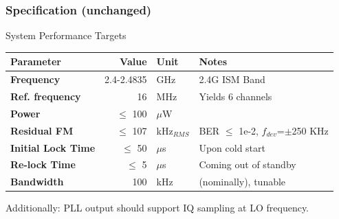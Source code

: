 \documentclass[t, screen, aspectratio=43]{beamer}
\begin{document}
\begin{frame}
	\frametitle{Specification (unchanged)}
	\begin{block}{System Performance Targets}
		\scriptsize
		\begin{table}[h!]
			\centering
			\def\arraystretch{1.5}		
			\setlength\arrayrulewidth{0.75pt}
			\setlength{\tabcolsep}{1em} %
			\begin{tabular}{|l|r|l|l|}
				\hline 
				\rule[-1ex]{0pt}{2.5ex} \cellcolor{gray!40}\textbf{Parameter} & \cellcolor{gray!40}\textbf{Value} & \cellcolor{gray!40}\textbf{Unit }& \cellcolor{gray!40}\textbf{Notes}\\ 
				\hline 
				\rule[-1ex]{0pt}{2.5ex} \textbf{Frequency}  & 2.4-2.4835 & GHz & 2.4G ISM Band\\ 
				\hline 
				\rule[-1ex]{0pt}{2.5ex} \textbf{Ref. frequency} & 16 & MHz & Yields 6 channels \\ 
				\hline 
				\rule[-1ex]{0pt}{2.5ex} \textbf{Power} & $\leq$ 100  &$\mu$W & \\ 
				\hline 
				\rule[-1ex]{0pt}{2.5ex} \textbf{Residual FM} & $\leq$ 107  &kHz$_{RMS}$ & BER $\leq$ 1e-2, $f_{dev}$=$\pm$250 KHz\\ 
				\hline 
				\rule[-1ex]{0pt}{2.5ex} \textbf{Initial Lock Time} & $\leq$ 50 & $\mu$s & Upon cold start \\ 
				\hline 
				\rule[-1ex]{0pt}{2.5ex} \textbf{Re-lock Time} & $\leq$ 5 & $\mu$s & Coming out of standby \\ 
				\hline 
				\rule[-1ex]{0pt}{2.5ex} \textbf{Bandwidth} & 100 & kHz & (nominally), tunable \\ 
				\hline 
			\end{tabular} 
		\end{table}   
		Additionally: PLL output should support IQ sampling at LO frequency.
	\end{block}    
\end{frame}
\end{document}
